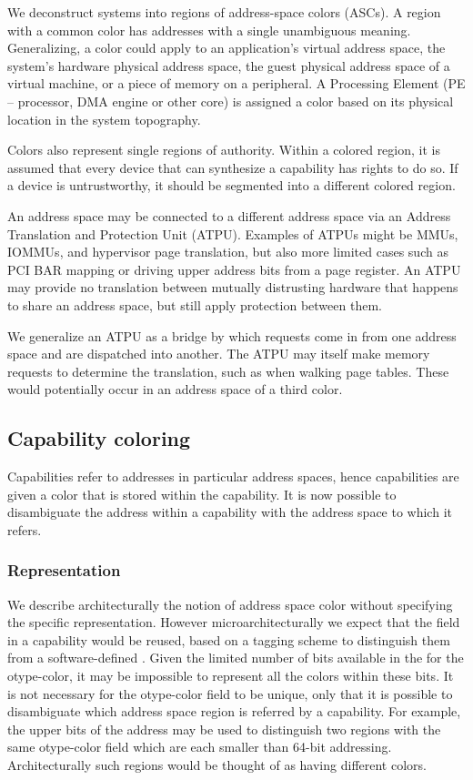 We deconstruct systems into regions of address-space colors (ASCs).  A region with a common color has addresses with a single unambiguous meaning.  Generalizing, a color could apply to an application's virtual address space, the system's hardware physical address space, the guest physical address space of a virtual machine, or a piece of memory on a peripheral.
A Processing Element (PE -- processor, DMA engine or other core) is assigned a color based on its physical location in the system topography.

Colors also represent single regions of authority.  Within a colored region, it is assumed that every device that can synthesize a capability has rights to do so.  If a device is untrustworthy, it should be segmented into a different colored region.

An address space may be connected to a different address space via an Address Translation and Protection Unit (ATPU).  Examples of ATPUs might be MMUs, IOMMUs, and hypervisor page translation, but also more limited cases such as PCI BAR mapping or driving upper address bits from a page register.  An ATPU may provide no translation between mutually distrusting hardware that happens to share an address space, but still apply protection between them.

We generalize an ATPU as a bridge by which requests come in from one address space and are dispatched into another.  The ATPU may itself make memory requests to determine the translation, such as when walking page tables.  These would potentially occur in an address space of a third color.

\subsection{Capability coloring}
Capabilities refer to addresses in particular address spaces, hence capabilities are given a color that is stored within the capability.  It is now possible to disambiguate the address within a capability with the address space to which it refers.

\subsubsection{Representation}
We describe architecturally the notion of address space color without specifying the specific representation.
However microarchitecturally we expect that the \cotype{} field in a capability would be reused, based on a tagging scheme to distinguish them from a software-defined \cotype{}.  Given the limited number of bits available in the \cotype{} for the otype-color, it may be impossible to represent all the colors within these bits.  It is not necessary for the otype-color field to be unique, only that it is possible to disambiguate which address space region is referred by a capability.  For example, the upper bits of the address may be used to distinguish two regions with the same otype-color field which are each smaller than 64-bit addressing.  Architecturally such regions would be thought of as having different colors.

